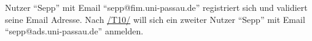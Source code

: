 \begin{description}
	  Nutzer ``Sepp'' mit Email ``sepp@fim.uni-passau.de'' registriert sich und validiert seine Email Adresse.
	 Nach \hyperref[t10]{/T10/} will sich ein zweiter Nutzer ``Sepp'' mit Email ``sepp@ads.uni-passau.de'' anmelden.
\end{description}